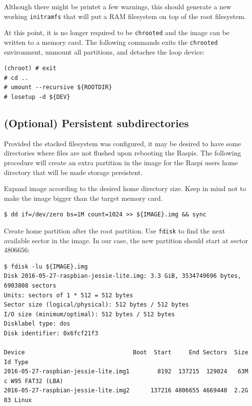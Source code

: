 Although there might be printet a few warnings, this should generate
a new working \texttt{initramfs} that will put a \ac{RAM} filesystem
on top of the root filesystem.

At this point, it is no longer required to be \texttt{chrooted} and the image
can be written to a memory card. The following commands exits the \texttt{chrooted}
environment, unmount all partitions, and detaches the loop device:

\begin{lstlisting}[]
(chroot) # exit
# cd ..
# umount --recursive ${ROOTDIR}
# losetup -d ${DEV}
\end{lstlisting}
\FloatBarrier
\vspace{-5mm}

\subsection{(Optional) Persistent subdirectories}

Provided the stacked filesystem was configured, it may be desired to have
some directories where files are not flushed upon rebooting the \ac{Raspi}s.
The following procedure will create an extra partition in the image for
the \ac{Raspi} users home directory that will be made storage persistent.

Expand image according to the desired home directory size. Keep in mind not
to make the image bigger than the target memory card.
\begin{lstlisting}[]
$ dd if=/dev/zero bs=1M count=1024 >> ${IMAGE}.img && sync
\end{lstlisting}
\FloatBarrier
\vspace{-5mm}

Create home partition after the root partition. Use \texttt{fdisk} to
find the next available sector in the image. In our case, the new
partition should start at sector 4806656:
\begin{lstlisting}[]
$ fdisk -lu ${IMAGE}.img
Disk 2016-05-27-raspbian-jessie-lite.img: 3.3 GiB, 3534749696 bytes, 6903808 sectors
Units: sectors of 1 * 512 = 512 bytes
Sector size (logical/physical): 512 bytes / 512 bytes
I/O size (minimum/optimal): 512 bytes / 512 bytes
Disklabel type: dos
Disk identifier: 0x6fcf21f3

Device                               Boot  Start     End Sectors  Size Id Type
2016-05-27-raspbian-jessie-lite.img1        8192  137215  129024   63M  c W95 FAT32 (LBA)
2016-05-27-raspbian-jessie-lite.img2      137216 4806655 4669440  2.2G 83 Linux
\end{lstlisting}
\FloatBarrier
\vspace{-5mm}

